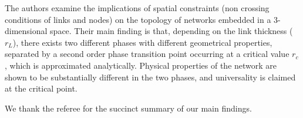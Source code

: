 \documentclass[11pt]{article}
\begin{document}
\begin{response}


\end{response}

\newpage

\begin{response}{The authors examine the implications of spatial constraints (non crossing conditions of links and nodes) on the topology of networks embedded in a 3-dimensional space. 
Their main finding is that, depending on the link thickness ($r_L$), there exists two different phases with different geometrical properties, separated by a second order phase transition point occurring at a critical value $r_c$, which is approximated analytically. 
Physical properties of the network are shown to be substantially different in the two phases, and universality is claimed at the critical point. 
}

We thank the referee for the succinct summary of our main findings. 
\end{response}
\end{document}
